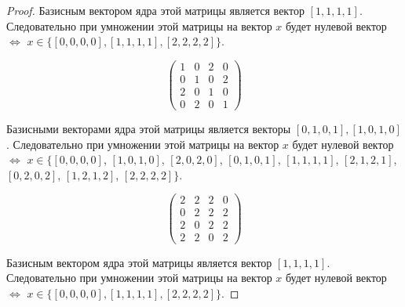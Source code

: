 \documentclass[bibliography=totoc, a4paper, 14pt]{extarticle}
\begin{document}
\begin{proof}
Базисным вектором ядра этой матрицы является вектор $[1, 1, 1, 1]$. Следовательно при умножении этой матрицы на
вектор $x$ будет нулевой вектор $\Leftrightarrow$ $x \in \{[0, 0, 0, 0], [1, 1, 1, 1], [2, 2, 2, 2]\}$.

$$ \begin{pmatrix}
1 & 0 & 2 & 0 \\
0 & 1 & 0 & 2 \\
2 & 0 & 1 & 0 \\
0 & 2 & 0 & 1
\end{pmatrix} $$

Базисными векторами ядра этой матрицы является векторы $[0, 1, 0, 1], [1,0,1,0]$. Следовательно при умножении
этой матрицы на вектор $x$ будет нулевой вектор $\Leftrightarrow$ $x \in \{[0, 0, 0, 0]$, $[1, 0, 1, 0]$,
$[2, 0, 2, 0]$, $[0, 1, 0, 1]$, $[1, 1, 1, 1]$, $[2, 1, 2, 1]$, $[0, 2, 0, 2]$, $[1, 2, 1, 2]$, $[2, 2, 2, 2]\}$.

$$ \begin{pmatrix}
2 & 2 & 2 & 0 \\
0 & 2 & 2 & 2 \\
2 & 0 & 2 & 2 \\
2 & 2 & 0 & 2
\end{pmatrix} $$

Базисным вектором ядра этой матрицы является вектор $[1, 1, 1, 1]$. Следовательно при умножении этой матрицы на
вектор $x$ будет нулевой вектор $\Leftrightarrow$ $x \in \{[0, 0, 0, 0], [1, 1, 1, 1], [2, 2, 2, 2]\}$.
\end{proof}
\end{document}
